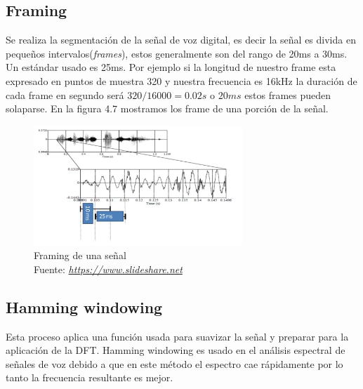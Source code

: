 	\subsection{Framing}
	Se realiza la segmentación de la señal de voz digital, es decir la señal es divida en pequeños intervalos(\textit{frames}), estos generalmente son del rango de 20ms a 30ms. Un estándar usado es 25ms. Por ejemplo si la longitud de nuestro frame esta expresado en puntos de muestra 320 y nuestra frecuencia es 16kHz la duración de cada frame en segundo será $320/16000=0.02s$ o $20ms$ estos frames pueden solaparse. En la figura 4.7 mostramos los frame de una porción de la señal.
	 \begin{figure}[H]
	\centering
	\includegraphics[width=0.7\textwidth]{Figures/framing.png}
	\caption{Framing de una señal \\ Fuente:  \href{https://www.slideshare.net/niranjankumar47/final-project-new-49797350}{\textit{https://www.slideshare.net}}}
	\label{ondaSS}
	
	\end{figure}
	\subsection{Hamming windowing}
	Esta proceso aplica una función usada para suavizar la señal y preparar para la aplicación de la DFT. Hamming windowing es usado en el análisis espectral de señales de voz debido a que en este método el espectro cae rápidamente por lo tanto la frecuencia resultante es mejor.

